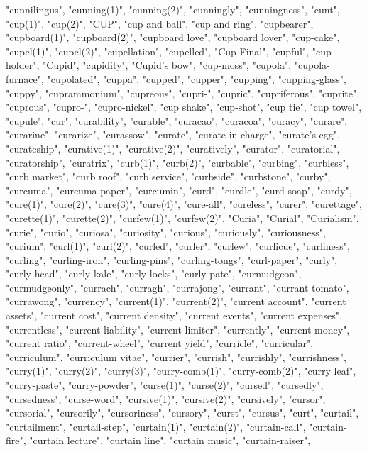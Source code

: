 "cunnilingus",
"cunning(1)",
"cunning(2)",
"cunningly",
"cunningness",
"cunt",
"cup(1)",
"cup(2)",
"CUP",
"cup and ball",
"cup and ring",
"cupbearer",
"cupboard(1)",
"cupboard(2)",
"cupboard love",
"cupboard lover",
"cup-cake",
"cupel(1)",
"cupel(2)",
"cupellation",
"cupelled",
"Cup Final",
"cupful",
"cup-holder",
"Cupid",
"cupidity",
"Cupid's bow",
"cup-moss",
"cupola",
"cupola-furnace",
"cupolated",
"cuppa",
"cupped",
"cupper",
"cupping",
"cupping-glass",
"cuppy",
"cuprammonium",
"cupreous",
"cupri-",
"cupric",
"cupriferous",
"cuprite",
"cuprous",
"cupro-",
"cupro-nickel",
"cup shake",
"cup-shot",
"cup tie",
"cup towel",
"cupule",
"cur",
"curability",
"curable",
"curacao",
"curacoa",
"curacy",
"curare",
"curarine",
"curarize",
"curassow",
"curate",
"curate-in-charge",
"curate's egg",
"curateship",
"curative(1)",
"curative(2)",
"curatively",
"curator",
"curatorial",
"curatorship",
"curatrix",
"curb(1)",
"curb(2)",
"curbable",
"curbing",
"curbless",
"curb market",
"curb roof",
"curb service",
"curbside",
"curbstone",
"curby",
"curcuma",
"curcuma paper",
"curcumin",
"curd",
"curdle",
"curd soap",
"curdy",
"cure(1)",
"cure(2)",
"cure(3)",
"cure(4)",
"cure-all",
"cureless",
"curer",
"curettage",
"curette(1)",
"curette(2)",
"curfew(1)",
"curfew(2)",
"Curia",
"Curial",
"Curialism",
"curie",
"curio",
"curiosa",
"curiosity",
"curious",
"curiously",
"curiousness",
"curium",
"curl(1)",
"curl(2)",
"curled",
"curler",
"curlew",
"curlicue",
"curliness",
"curling",
"curling-iron",
"curling-pins",
"curling-tongs",
"curl-paper",
"curly",
"curly-head",
"curly kale",
"curly-locks",
"curly-pate",
"curmudgeon",
"curmudgeonly",
"currach",
"curragh",
"currajong",
"currant",
"currant tomato",
"currawong",
"currency",
"current(1)",
"current(2)",
"current account",
"current assets",
"current cost",
"current density",
"current events",
"current expenses",
"currentless",
"current liability",
"current limiter",
"currently",
"current money",
"current ratio",
"current-wheel",
"current yield",
"curricle",
"curricular",
"curriculum",
"curriculum vitae",
"currier",
"currish",
"currishly",
"currishness",
"curry(1)",
"curry(2)",
"curry(3)",
"curry-comb(1)",
"curry-comb(2)",
"curry leaf",
"curry-paste",
"curry-powder",
"curse(1)",
"curse(2)",
"cursed",
"cursedly",
"cursedness",
"curse-word",
"cursive(1)",
"cursive(2)",
"cursively",
"cursor",
"cursorial",
"cursorily",
"cursoriness",
"cursory",
"curst",
"cursus",
"curt",
"curtail",
"curtailment",
"curtail-step",
"curtain(1)",
"curtain(2)",
"curtain-call",
"curtain-fire",
"curtain lecture",
"curtain line",
"curtain music",
"curtain-raiser",
